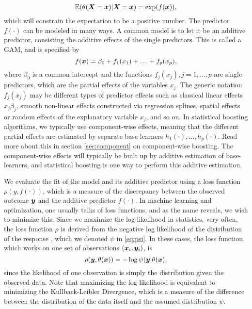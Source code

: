 \begin{align}
    \mathbb{E}(\theta(\bm{X}=\bm{x})|\bm{X}=\bm{x})=\exp(f(\bm{x})),
\end{align}
which will constrain the expectation to be a positive number.
The predictor $f(\cdot)$ can be modeled in many ways. A common model is to let it be an additive predictor, consisting the additive effects of the single predictors. This is called a GAM, and is specified by
\begin{equation}\label{eq:gam}
    f(\bm{x})=\beta_0+f_1(x_1)+\ldots+f_p(x_p),
\end{equation}
where $\beta_0$ is a common intercept and the functions $f_j(x_j),j=1,\ldots,p$ are single predictors, which are the partial effects of the variables $x_j$. The generic notation $f_j(x_j)$ may be different types of predictor effects such as classical linear effects $x_j\beta_j$, smooth non-linear effects constructed via regression splines, spatial effects or random effects of the explanatory variable $x_j$, and so on.
In statistical boosting algorithms, we typically use component-wise effects, meaning that the different partial effects are estimated by separate base-learners $h_1(\cdot),\ldots,h_p(\cdot)$. Read more about this in section \ref{sec:component} on component-wise boosting. The component-wise effects will typically be built up by additive estimation of base-learners, and statistical boosting is one way to perform this additive estimation.

We evaluate the fit of the model and its additive predictor using a loss function $\rho(y,f(\cdot))$, which is a measure of the discrepancy between the observed outcome $\bm{y}$ and the additive predictor $f(\cdot)$. In machine learning and optimization, one usually talks of loss functions, and as the name reveals, we wish to minimize this. Since we maximize the log-likelihood in statistics, very often, the loss function $\rho$ is derived from the negative log likelihood of the distribution of the response \citep{mayr14a, bovelstadborgan}, which we denoted $\psi$ in \eqref{eq:psi}. In these cases, the loss function, which works on one set of observations $(\bm{x}_i,\bm{y}_i)$, is
\begin{equation}
    \rho(\bm{y},\theta(\bm{x}))=-\log{\psi(\bm{y}|\theta(\bm{x})},
\end{equation}
since the likelihood of one observation is simply the distribution given the observed data. Note that maximizing the log-likelihood is equivalent to minimizing the Kullback-Leibler Divergence, which is a measure of the difference between the distribution of the data itself and the assumed distribution $\psi$. 

